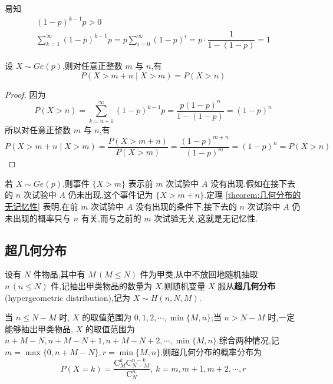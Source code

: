 易知
\begin{gather*}
    (1-p)^{k-1} p > 0 \\
    \sum_{k=1}^\infty (1-p)^{k-1} p = p \sum_{i=0}^\infty (1-p)^i = p \cdot \dfrac{1}{1-(1-p)} = 1    
\end{gather*}

\begin{theorem}
    \indent 设 $X \sim Ge(p)$,则对任意正整数 $m$ 与 $n$,有
    \begin{equation}
        P(X > m+n \mid X>m) = P(X>n)
    \end{equation}
\end{theorem}

\begin{proof}
    因为
    $$
    P(X>n) = \sum_{k=n+1}^{\infty} (1-p)^{k-1} p = \dfrac{p (1-p)^n}{1-(1-p)} = (1-p)^n
    $$
    所以对任意正整数 $m$ 与 $n$,有
    $$
    P(X > m+n \mid X>m) = \dfrac{P(X > m+n)}{P(X>m)} = \dfrac{(1-p)^{m+n}}{(1-p)^m} = (1-p)^n = P(X>n)
    $$

    \vspace{-2em}
\end{proof}

\begin{note}
    \indent 若 $X \sim Ge(p)$,则事件 $\{ X>m \}$ 表示前 $m$ 次试验中 $A$ 没有出现.假如在接下去的 $n$ 次试验中 $A$ 仍未出现,这个事件记为 $\{ X > m+n \}$.定理 \ref{theorem:几何分布的无记忆性} 表明,在前 $m$ 次试验中 $A$ 没有出现的条件下,接下去的 $n$ 次试验中 $A$ 仍未出现的概率只与 $n$ 有关,而与之前的 $m$ 次试验无关,这就是无记忆性.
\end{note}

\subsection{超几何分布}

设有 $N$ 件物品,其中有 $M \, (M \leqslant N)$ 件为甲类,从中不放回地随机抽取 $n \, (n \leqslant N)$ 件,记抽出甲类物品的数量为 $X$,则随机变量 $X$ 服从\textbf{超几何分布}(hypergeometric distribution),记为 $X \sim H(n,N,M)$.

当 $n \leqslant N-M$ 时, $X$ 的取值范围为 $0,1,2,\cdots,\min\{ M,n \}$;当 $n > N-M$ 时,一定能够抽出甲类物品, $X$ 的取值范围为 $n+M-N, n+M-N+1, n+M-N+2, \cdots, \min\{ M,n \}$.综合两种情况,记 $m = \max\{ 0, n+M-N \}, r = \min\{ M,n \}$,则超几何分布的概率分布为
$$
P(X=k) = \dfrac{\mathrm{C}_M^k \mathrm{C}_{N-M}^{n-k}}{\mathrm{C}_N^n},\ k=m, m+1, m+2, \cdots, r
$$

